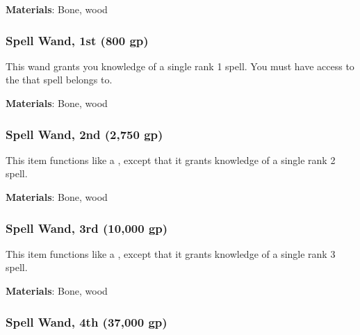 \vspace{0.25em}
\textbf{Materials}: Bone, wood


\lowercase{\hypertarget{item:Spell Wand, 1st}{}}\label{item:Spell Wand, 1st}
\hypertarget{item:Spell Wand, 1st}{\subsubsection{Spell Wand, 1st\hfill{} (800 gp)}}

This wand grants you knowledge of a single rank 1 spell.
You must have access to the  that spell belongs to.



\vspace{0.25em}
\textbf{Materials}: Bone, wood


\lowercase{\hypertarget{item:Spell Wand, 2nd}{}}\label{item:Spell Wand, 2nd}
\hypertarget{item:Spell Wand, 2nd}{\subsubsection{Spell Wand, 2nd\hfill{} (2,750 gp)}}

This item functions like a , except that it grants knowledge of a single rank 2 spell.



\vspace{0.25em}
\textbf{Materials}: Bone, wood


\lowercase{\hypertarget{item:Spell Wand, 3rd}{}}\label{item:Spell Wand, 3rd}
\hypertarget{item:Spell Wand, 3rd}{\subsubsection{Spell Wand, 3rd\hfill{} (10,000 gp)}}

This item functions like a , except that it grants knowledge of a single rank 3 spell.



\vspace{0.25em}
\textbf{Materials}: Bone, wood


\lowercase{\hypertarget{item:Spell Wand, 4th}{}}\label{item:Spell Wand, 4th}
\hypertarget{item:Spell Wand, 4th}{\subsubsection{Spell Wand, 4th\hfill{} (37,000 gp)}}

